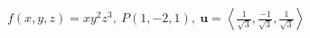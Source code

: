 \item $f(x, y, z) = xy^2z^3, \ P(1, -2, 1), \ \mathbf{u} = \left\langle \frac{1}{\sqrt{3}}, \frac{-1}{\sqrt{3}}, \frac{1}{\sqrt{3}} \right\rangle$
